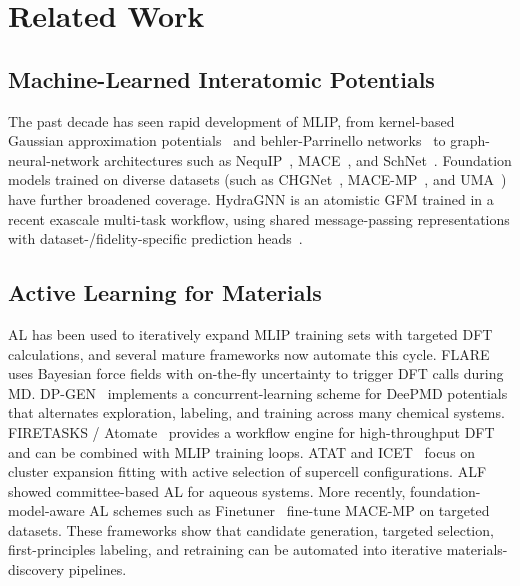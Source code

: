 \documentclass[conference]{IEEEtran}
\def\ac#1{#1}%
\def\acs#1{#1}%
\def\acp#1{#1}%
\begin{document}
\section{Related Work}
\label{sec:related}

\subsection{Machine-Learned Interatomic Potentials}
The past decade has seen rapid development of \acp{MLIP}, from kernel-based
Gaussian approximation potentials~\cite{bartok2010} and behler-Parrinello
networks~\cite{behler2007} to graph-neural-network architectures such as
NequIP~\cite{batzner2022}, MACE~\cite{batatia2022}, and
SchNet~\cite{schutt2018}. Foundation models trained on diverse datasets
(such as CHGNet~\cite{deng2023}, MACE-MP~\cite{batatia2023macemp}, and
UMA~\cite{wood2025uma}) have further broadened coverage. HydraGNN is an atomistic \ac{GFM} trained in a recent exascale multi-task
workflow, using shared message-passing representations with
dataset-/fidelity-specific prediction heads~\cite{hydragnn,lupopasini2026exascalegfm}.

\subsection{Active Learning for Materials}
\acs{AL} has been used to iteratively expand \acs{MLIP} training sets with
targeted \acs{DFT} calculations, and several mature frameworks now automate this
cycle. FLARE~\cite{vandermause2020,vandermause2022} uses Bayesian force fields
with on-the-fly uncertainty to trigger \acs{DFT} calls during \acs{MD}.
DP-GEN~\cite{zhang2020dpgen} implements a concurrent-learning scheme for
DeePMD potentials that alternates exploration, labeling, and training across
many chemical systems. FIRETASKS / Atomate~\cite{mathew2017atomate} provides
a workflow engine for high-throughput \acs{DFT} and can be combined with \acs{MLIP}
training loops. ATAT and ICET~\cite{icet2019} focus on cluster expansion
fitting with active selection of supercell configurations.
ALF~\cite{schran2020} showed committee-based \acs{AL} for
aqueous systems. More recently, foundation-model-aware AL schemes such as
Finetuner~\cite{batatia2023macemp} fine-tune MACE-MP on targeted datasets.
These frameworks show that candidate generation, targeted
selection, first-principles labeling, and retraining can be automated into
iterative materials-discovery pipelines.
\end{document}
